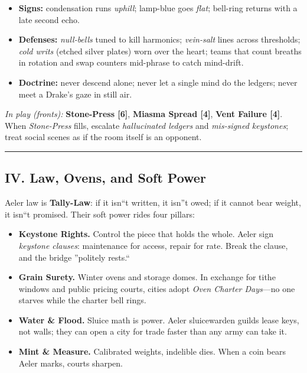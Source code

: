 \documentclass[11pt]{article}
\begin{document}
\begin{itemize}[leftmargin=*]
  \item \textbf{Signs:} condensation runs \emph{uphill}; lamp-blue goes \emph{flat}; bell-ring returns with a late second echo.
  \item \textbf{Defenses:} \emph{null-bells} tuned to kill harmonics; \emph{vein-salt} lines across thresholds; \emph{cold writs} (etched silver plates) worn over the heart; teams that count breaths in rotation and swap counters mid-phrase to catch mind-drift.
  \item \textbf{Doctrine:} never descend alone; never let a single mind do the ledgers; never meet a Drake's gaze in still air.
\end{itemize}

\textit{In play (fronts):} \textbf{Stone-Press [6]}, \textbf{Miasma Spread [4]}, \textbf{Vent Failure [4]}. When \emph{Stone-Press} fills, escalate \emph{hallucinated ledgers} and \emph{mis-signed keystones}; treat social scenes as if the room itself is an opponent.

\medskip\hrule\medskip

\subsection{IV. Law, Ovens, and Soft Power}

Aeler law is \textbf{Tally-Law}: if it isn``t written, it isn''t owed; if it cannot bear weight, it isn``t promised. Their soft power rides four pillars:

\begin{itemize}[leftmargin=*]
  \item \textbf{Keystone Rights.} Control the piece that holds the whole. Aeler sign \emph{keystone clauses}: maintenance for access, repair for rate. Break the clause, and the bridge ''politely rests.``
  \item \textbf{Grain Surety.} Winter ovens and storage domes. In exchange for tithe windows and public pricing courts, cities adopt \emph{Oven Charter Days}---no one starves while the charter bell rings.
  \item \textbf{Water \& Flood.} Sluice math is power. Aeler sluicewarden guilds lease keys, not walls; they can open a city for trade faster than any army can take it.
  \item \textbf{Mint \& Measure.} Calibrated weights, indelible dies. When a coin bears Aeler marks, courts sharpen.
\end{itemize}
\end{document}
